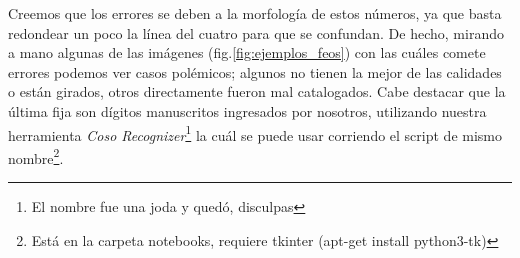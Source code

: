 Creemos que los errores se deben a la morfología de estos números, ya que basta redondear un poco la línea del cuatro para que se confundan. De hecho, mirando a mano algunas de las imágenes (fig.\ref{fig:ejemplos_feos}) con las cuáles comete errores podemos ver casos polémicos; algunos no tienen la mejor de las calidades o están girados, otros directamente fueron mal catalogados. Cabe destacar que la última fija son dígitos manuscritos ingresados por nosotros, utilizando nuestra herramienta \textit{Coso Recognizer}\footnote{El nombre fue una joda y quedó, disculpas} la cuál se puede usar corriendo el script de mismo nombre\footnote{Está en la carpeta notebooks, requiere tkinter (apt-get install python3-tk)}.
\begin{figure}
    \centering
    

\end{figure}
